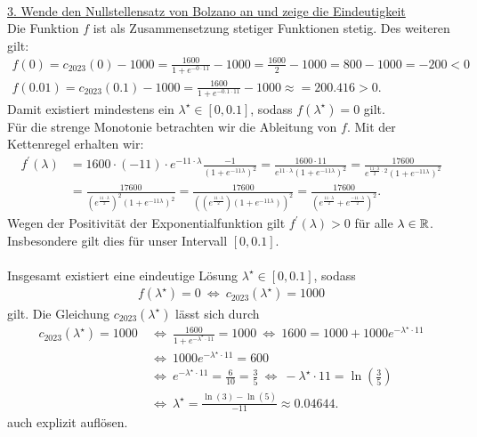 \\
\underline{3. Wende den Nullstellensatz von Bolzano an und zeige die Eindeutigkeit}\\
Die Funktion $f$ ist als Zusammensetzung stetiger Funktionen stetig. Des weiteren gilt:
\begin{align*}
	f(0) = c_{2023}(0) -1000 
	=
	\frac{1600}{1 + e^{-0 \cdot 11} } - 1000
	= 
	\frac{1600}{2} - 1000
	= 
	800 - 1000 = -200 < 0\\
	f(0.01) = c_{2023}(0.1) -1000 
	=
	\frac{1600}{1 + e^{-0.1 \cdot 11} } - 1000
	\approx
	= 
	200.416 > 0.
\end{align*}
Damit existiert mindestens ein $\lambda^\star \in [0,0.1]$, sodass $f(\lambda^\star) = 0$ gilt.\\ 
Für die strenge Monotonie betrachten wir die Ableitung von $f$. Mit der Kettenregel erhalten wir:
\begin{align*}
	f^\prime(\lambda)
	&=
	1600 \cdot (-11) \cdot e^{-11\cdot \lambda } \frac{-1}{\left(1 + e^{-11 \lambda}\right)^2}
	=
	\frac{1600 \cdot 11}{e^{11 \cdot \lambda} \left(1 + e^{-11 \lambda}\right)^2}
	=
	\frac{17600}{e^{\frac{11 \cdot \lambda}{2} \cdot 2} \left(1 + e^{-11 \lambda}\right)^2}\\
	&=
	\frac{17600}{\left(e^{\frac{11 \cdot \lambda}{2}  }\right)^2 \left(1 + e^{-11 \lambda}\right)^2}
	=
	\frac{17600}{\left(\left(e^{\frac{11 \cdot \lambda}{2}  }\right) \left(1 + e^{-11 \lambda}\right) \right)^2}
	=
	\frac{17600}{\left( e^{\frac{11 \cdot \lambda}{2}} + e^{\frac{-11 \cdot \lambda}{2}} \right)^2}.
\end{align*}
Wegen der Positivität der Exponentialfunktion gilt $f^\prime (\lambda) > 0 $ für alle $\lambda \in \mathbb{R}$. Insbesondere gilt dies für unser Intervall $[0,0.1]$.\\
\\
Insgesamt existiert eine eindeutige Lösung $\lambda^\star \in [0,0.1]$, sodass 
\begin{align*}
	f(\lambda^\star) = 0
	\ \Leftrightarrow \
	c_{2023}(\lambda^\star)  = 1000
\end{align*}
gilt. Die Gleichung $c_{2023}(\lambda^\star)$ lässt sich durch
\begin{align*}
	c_{2023}(\lambda^\star)  = 1000
	&\ \Leftrightarrow \
	\frac{1600}{1 + e^{- \lambda^\star \cdot 11}} = 1000
	\ \Leftrightarrow \
	1600 = 1000 + 1000 e^{- \lambda^\star \cdot 11}\\
	&\	\Leftrightarrow \
	1000 e^{- \lambda^\star \cdot 11} = 600\\
	&\	\Leftrightarrow \
	e^{- \lambda^\star \cdot 11} = \frac{6}{10} = \frac{3}{5}
	\ \Leftrightarrow \
	- \lambda^\star \cdot 11 = \ln \left(\frac{3}{5}\right)\\
	&\ \Leftrightarrow \
	\lambda^\star = \frac{\ln(3) - \ln(5)}{-11} \approx 0.04644.
\end{align*}
auch explizit auflösen.

